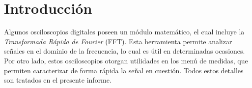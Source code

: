   \section{Introducción}
    Algunos osciloscopios digitales poseen un módulo matemático, el cual incluye la
    \textit{Transformada Rápida de Fourier} (FFT). Esta herramienta permite analizar
    señales en el dominio de la frecuencia, lo cual es útil en determinadas ocasiones.
    Por otro lado, estos osciloscopios otorgan utilidades en los menú de medidas, que
    permiten caracterizar de forma rápida la señal en cuestión. Todos
    estos detalles son tratados en el presente informe.
